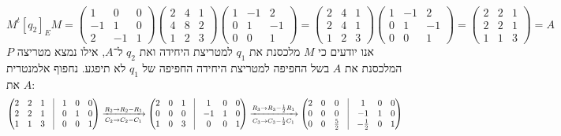 \[
	M^t {[q_2]}_E M
	= \begin{pmatrix}
		1 & 0 & 0 \\
		-1 & 1 & 0 \\
		2 & -1 & 1
	\end{pmatrix}
	\begin{pmatrix}
		2 & 4 & 1 \\
		4 & 8 & 2 \\
		1 & 2 & 3
	\end{pmatrix}
	\begin{pmatrix}
		1 & -1 & 2 \\
		0 & 1 & -1 \\
		0 & 0 & 1
	\end{pmatrix}
	= \begin{pmatrix}
		2 & 4 & 1 \\
		2 & 4 & 1 \\
		1 & 2 & 3
	\end{pmatrix}
	\begin{pmatrix}
		1 & -1 & 2 \\
		0 & 1 & -1 \\
		0 & 0 & 1
	\end{pmatrix}
	= \begin{pmatrix}
		2 & 2 & 1 \\
		2 & 2 & 1 \\
		1 & 1 & 3
	\end{pmatrix}
	= A
\]
אנו יודעים כי $M$ מלכסנת את $q_1$ למטריצת היחידה ואת $q_2$ ל־$A$, אילו נמצא מטריצה $P$ המלכסנת את $A$ בשל החפיפה למטריצת היחידה החפיפה של $q_1$ לא תיפגע.
נחפוף אלמנטרית את $A$:
\[
	\begin{pmatrix}
		2 & 2 & 1 & \vline & 1 & 0 & 0 \\
		2 & 2 & 1 & \vline & 0 & 1 & 0 \\
		1 & 1 & 3 & \vline & 0 & 0 & 1
	\end{pmatrix}
	\xrightarrow[C_2 \to C_2 - C_1]{R_2 \to R_2 - R_1}
	\begin{pmatrix}
		2 & 0 & 1 & \vline & 1 & 0 & 0 \\
		0 & 0 & 0 & \vline & -1 & 1 & 0 \\
		1 & 0 & 3 & \vline & 0 & 0 & 1
	\end{pmatrix}
	\xrightarrow[C_3 \to C_3 - \frac{1}{2}C_1]{R_3 \to R_3 - \frac{1}{2}R_1}
	\begin{pmatrix}
		2 & 0 & 0 & \vline & 1 & 0 & 0 \\
		0 & 0 & 0 & \vline & -1 & 1 & 0 \\
		0 & 0 & \frac{5}{2} & \vline & -\frac{1}{2} & 0 & 1
	\end{pmatrix}
\]
